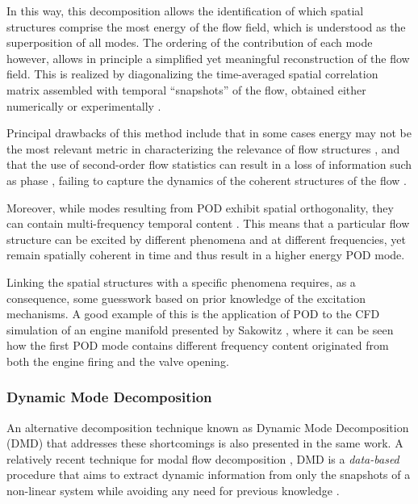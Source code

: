 In this way, this decomposition allows the identification of which spatial structures comprise the most energy of the flow field, which is understood as the superposition of all modes. The ordering of the contribution of each mode however, allows in principle a simplified yet meaningful reconstruction of the flow field. This is realized by diagonalizing the time-averaged spatial correlation matrix assembled with temporal ``snapshots'' of the flow, obtained either numerically or experimentally \cite{schmid2010dynamic,bagheri2013koopman}.

Principal drawbacks of this method include that in some cases energy may not be the most relevant metric in characterizing the relevance of flow structures \cite{schmid2010dynamic}, and that the use of second-order flow statistics can result in a loss of information such as phase \cite{aubry1991hidden}, failing to capture the dynamics of the coherent structures of the flow \cite{schmid2011applications}.

Moreover, while modes resulting from POD exhibit spatial orthogonality, they can contain multi-frequency temporal content \cite{jovanovic2014sparsity,sakowitz2014flow}. This means that a particular flow structure can be excited by different phenomena and at different frequencies, yet remain spatially coherent in time and thus result in a higher energy POD mode. 

Linking the spatial structures with a specific phenomena requires, as a consequence, some guesswork based on prior knowledge of the excitation mechanisms. A good example of this is the application of POD to the CFD simulation of an engine manifold presented by Sakowitz \cite{sakowitz2014flow}, where it can be seen how the first POD mode contains different frequency content originated from both the engine firing and the valve opening.

\subsubsection{Dynamic Mode Decomposition}

An alternative decomposition technique known as Dynamic Mode Decomposition (DMD) that addresses these shortcomings is also presented in the same work. A relatively recent technique for modal flow decomposition \cite{rowley2009spectral,schmid2010dynamic,chen2012variants}, DMD is a \textit{data-based} procedure that aims to extract dynamic information from only the snapshots of a non-linear system while avoiding any need for previous knowledge \cite{schmid2010dynamic}. 

